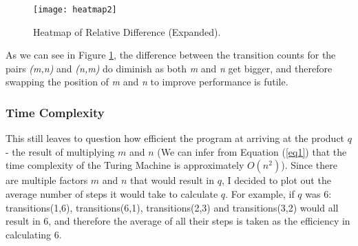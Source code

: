\documentclass[a4paper,12pt]{article}
\begin{document}
\begin{figure}[H]
	\texttt{[image: heatmap2]}
	\caption{Heatmap of Relative Difference (Expanded).}
	\label{fig:heatmap2}
\end{figure}

As we can see in Figure \ref{fig:heatmap2}, the difference between the transition counts for the pairs \textit{(m,n)} and \textit{(n,m)} do diminish as both \textit{m} and \textit{n} get bigger, and therefore swapping the position of \textit{m} and \textit{n} to improve performance is futile.
\subsubsection{Time Complexity}
This still leaves to question how efficient the program at arriving at the product $q$ - the result of multiplying $m$ and $n$ (We can infer from Equation (\ref{eq1}) that the time complexity of the Turing Machine is approximately $O(n^2)$). Since there are multiple factors $m$ and $n$ that would result in $q$, I decided to plot out the average number of steps it would take to calculate $q$. For example, if $q$ was 6:
transitions(1,6), transitions(6,1), transitions(2,3) and transitions(3,2) would all result in 6, and therefore the average of all their steps is taken as the efficiency in calculating 6. 
\end{document}
